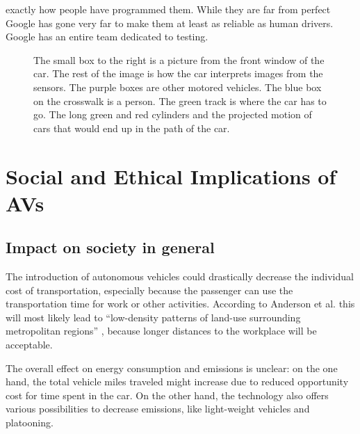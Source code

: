 \documentclass[11pt]{article}
\begin{document}
exactly how people have programmed them. While they are far from perfect Google has gone very far to make them at least as
reliable as human drivers. Google has an entire team dedicated to testing. 
\begin{figure}[!ht]
  \centering
                  \caption{The small box to the right is a picture from the front window of the car. The rest of the
                      image is how the car interprets images from the sensors. The purple boxes are other motored
                          vehicles. The blue box on the crosswalk is a person. The green track is where the car has to
                          go. The long green and red cylinders and the projected motion of cars that would end up in the
                  path of the car.}
\end{figure}

\par


\section{Social and Ethical Implications of AVs}
\subsection{Impact on society in general}
The introduction of autonomous vehicles could drastically decrease the individual cost of transportation, especially because the passenger can use the transportation time for work or other activities. According to Anderson et al. this will most likely lead to ``low-density patterns of land-use surrounding metropolitan regions'' \cite{Anderson2014rand}, because longer distances to the workplace will be acceptable.

The overall effect on energy consumption and emissions is unclear: on the one hand, the total vehicle miles traveled might increase due to reduced opportunity cost for time spent in the car. On the other hand, the technology also offers various possibilities to decrease emissions, like light-weight vehicles and platooning.
\end{document}
